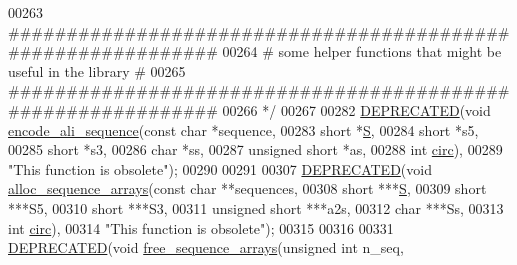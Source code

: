 \begin{DoxyCode}
00263 \textcolor{comment}{ #############################################################}
00264 \textcolor{comment}{ # some helper functions that might be useful in the library #}
00265 \textcolor{comment}{ #############################################################}
00266 \textcolor{comment}{ */}
00267 
00282 \mbox{\hyperlink{aln__util_8h_aab347a3c03fbe8e7319551b9fa0cce4a}{DEPRECATED}}(\textcolor{keywordtype}{void} \mbox{\hyperlink{group__aln__utils_gaa3e40277c837d6f7603afe319884c786}{encode\_ali\_sequence}}(\textcolor{keyword}{const} \textcolor{keywordtype}{char}      *sequence,
00283                                     \textcolor{keywordtype}{short}           *\mbox{\hyperlink{group__energy__parameters__rw_gga7bf2bb363bcf5ce50d60255d256e5682af1ce01387d2348f8b858721a7db81670}{S}},
00284                                     \textcolor{keywordtype}{short}           *s5,
00285                                     \textcolor{keywordtype}{short}           *s3,
00286                                     \textcolor{keywordtype}{char}            *ss,
00287                                     \textcolor{keywordtype}{unsigned} \textcolor{keywordtype}{short}  *as,
00288                                     \textcolor{keywordtype}{int}             \mbox{\hyperlink{group__model__details_gaf9202a1a09f5828dc731e2d9a10fa111}{circ}}),
00289           \textcolor{stringliteral}{"This function is obsolete"});
00290 
00291 
00307 \mbox{\hyperlink{aln__util_8h_aab347a3c03fbe8e7319551b9fa0cce4a}{DEPRECATED}}(\textcolor{keywordtype}{void}  \mbox{\hyperlink{group__aln__utils_ga8a560930f7f2582cc3967723a86cfdfa}{alloc\_sequence\_arrays}}(\textcolor{keyword}{const} \textcolor{keywordtype}{char}     **sequences,
00308                                        \textcolor{keywordtype}{short}          ***\mbox{\hyperlink{group__energy__parameters__rw_gga7bf2bb363bcf5ce50d60255d256e5682af1ce01387d2348f8b858721a7db81670}{S}},
00309                                        \textcolor{keywordtype}{short}          ***S5,
00310                                        \textcolor{keywordtype}{short}          ***S3,
00311                                        \textcolor{keywordtype}{unsigned} \textcolor{keywordtype}{short} ***a2s,
00312                                        \textcolor{keywordtype}{char}           ***Ss,
00313                                        \textcolor{keywordtype}{int}            \mbox{\hyperlink{group__model__details_gaf9202a1a09f5828dc731e2d9a10fa111}{circ}}),
00314           \textcolor{stringliteral}{"This function is obsolete"});
00315 
00316 
00331 \mbox{\hyperlink{aln__util_8h_aab347a3c03fbe8e7319551b9fa0cce4a}{DEPRECATED}}(\textcolor{keywordtype}{void}  \mbox{\hyperlink{group__aln__utils_ga298a420a8c879202e2617b3f724fde38}{free\_sequence\_arrays}}(\textcolor{keywordtype}{unsigned} \textcolor{keywordtype}{int}    n\_seq,

\end{DoxyCode}
